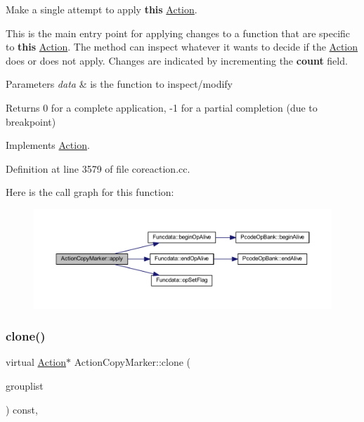 Make a single attempt to apply {\bfseries{this}} \mbox{\hyperlink{class_action}{Action}}. 

This is the main entry point for applying changes to a function that are specific to {\bfseries{this}} \mbox{\hyperlink{class_action}{Action}}. The method can inspect whatever it wants to decide if the \mbox{\hyperlink{class_action}{Action}} does or does not apply. Changes are indicated by incrementing the {\bfseries{count}} field. 
\begin{DoxyParams}{Parameters}
{\em data} & is the function to inspect/modify \\
\hline
\end{DoxyParams}
\begin{DoxyReturn}{Returns}
0 for a complete application, -\/1 for a partial completion (due to breakpoint) 
\end{DoxyReturn}


Implements \mbox{\hyperlink{class_action_aac1c3999d6c685b15f5d9765a4d04173}{Action}}.



Definition at line 3579 of file coreaction.\+cc.

Here is the call graph for this function\+:
\nopagebreak
\begin{figure}[H]
\begin{center}
\leavevmode
\includegraphics[width=350pt]{class_action_copy_marker_a95c1faed40c03761a5fac5c87af6a272_cgraph}
\end{center}
\end{figure}
\mbox{\label{class_action_copy_marker_adb38f76f4afa65f97dbc971c2096437f}} 
\subsubsection{\texorpdfstring{clone()}{clone()}}
{\footnotesize\ttfamily virtual \mbox{\hyperlink{class_action}{Action}}$\ast$ Action\+Copy\+Marker\+::clone (\begin{DoxyParamCaption}\item[{const \mbox{\hyperlink{class_action_group_list}{Action\+Group\+List}} \&}]{grouplist }\end{DoxyParamCaption}) const\hspace{0.3cm}{\ttfamily [inline]}, {\ttfamily [virtual]}}



